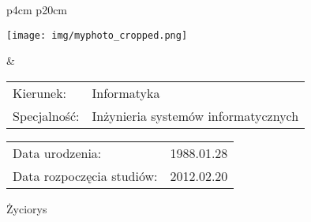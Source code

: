 \begin{titlepage}
    \newpage\thispagestyle{empty}
    \begin{tabular}{p{4cm} p{20cm}}
    \begin{minipage}{4cm}
    \texttt{[image: img/myphoto\_cropped.png]}
    \end{minipage}
    &
    \begin{minipage}{20cm}
    \begin{flushleft}
    \par\noindent\vspace{1\baselineskip}
    \begin{tabular}[h]{l l}
    {\normalsize Kierunek:} & Informatyka\\
    {\normalsize Specjalność:} & Inżynieria systemów informatycznych
    \end{tabular}
    \par\noindent\vspace{2\baselineskip}
    \begin{tabular}[h]{l r}
    {\normalsize Data urodzenia:} & {\normalsize 1988.01.28} \\
    {\normalsize Data rozpoczęcia studiów:} & {\normalsize 2012.02.20}
    \end{tabular}
    \par\noindent\vspace{2\baselineskip}
    \end{flushleft}
    \end{minipage}
    \end{tabular}
    \vspace*{1\baselineskip}
    \begin{center}
	{Życiorys}\par\bigskip
    \end{center}


\end{titlepage}
